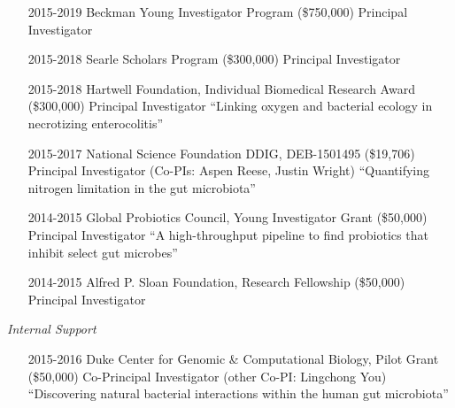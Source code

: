 \documentclass[overlapped,line,11pt]{res}
\begin{document}
\begin{resume}
\begin{itemize}[leftmargin=2cm, style=sameline]

\item[2015-2019] Beckman Young Investigator Program (\$750,000) \newline Principal Investigator 

\item[2015-2018] Searle Scholars Program (\$300,000) \newline Principal Investigator 
  
\item[2015-2018] Hartwell Foundation, Individual Biomedical Research Award (\$300,000) \newline Principal Investigator 
  \newline ``Linking oxygen and bacterial ecology in necrotizing enterocolitis''

\item[2015-2017] National Science Foundation DDIG, DEB-1501495 (\$19,706) \newline Principal Investigator (Co-PIs: Aspen Reese, Justin Wright) 
  \newline ``Quantifying nitrogen limitation in the gut microbiota''

\item[2014-2015] Global Probiotics Council, Young Investigator Grant (\$50,000) \newline Principal Investigator 
  \newline ``A high-throughput pipeline to find probiotics that
  inhibit select gut microbes''

\item[2014-2015] Alfred P. Sloan Foundation, Research Fellowship (\$50,000) \newline Principal Investigator 

\end{itemize}

\emph{Internal Support}
\vspace{.1in}

\begin{itemize}[leftmargin=2cm, style=sameline]

\item[2015-2016] Duke Center for Genomic \& Computational Biology, Pilot Grant
  (\$50,000) \newline Co-Principal Investigator (other Co-PI:
  Lingchong You) \newline ``Discovering natural bacterial interactions
  within the human gut microbiota''


\end{itemize}
\end{resume}
\end{document}
